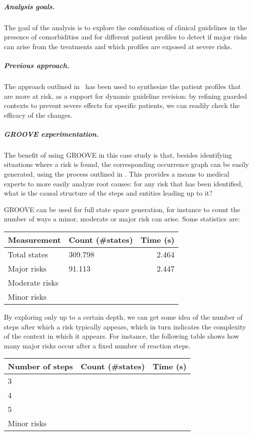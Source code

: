 \subparagraph*{Analysis goals.}
The goal of the analysis is to explore the combination of clinical guidelines in the presence of comorbidities and for different patient profiles to detect if major risks can arise from the treatments and which profiles are exposed at severe risks.

\subparagraph*{Previous approach.}
The approach outlined in~\cite{DBLP:conf/cmsb/BowlesBBFGM24} has been used to synthesize the patient profiles that are more at risk, as a support for dynamic guideline revision: by refining guarded contexts to prevent severe effects for specific patients, we can readily check the efficacy of the changes.

\subparagraph*{GROOVE experimentation.}

The benefit of using GROOVE in this case study is that, besides identifying situations where a risk is found, the corresponding occurrence graph can be easily generated, using the process outlined in . This provides a means to medical experts to more easily analyze root causes: for any risk that has been identified, what is the causal structure of the steps and entities leading up to it?

GROOVE can be used for full state space generation, for instance to count the number of ways a minor, moderate or major risk can arise. Some statistics are:

\begin{center}
\begin{tabular}{llr}
\bf Measurement & \bf Count (\#states) & Time (s) \\
\hline
Total states & 309.798 & 2.464 \\
Major risks & 91.113 & 2.447 \\
Moderate risks & & \\
Minor risks & & 
\end{tabular}
\end{center}

By exploring only up to a certain depth, we can get some idea of the number of steps after which a risk typically appears, which in turn indicates the complexity of the context in which it appears. For instance, the following table shows how many major risks occur after a fixed number of reaction steps.

\begin{center}
\begin{tabular}{llr}
\bf Number of steps & \bf Count (\#states) & Time (s) \\
\hline
3 & & \\
4 & & \\
5 & & \\
Minor risks & & 
\end{tabular}
\end{center}

